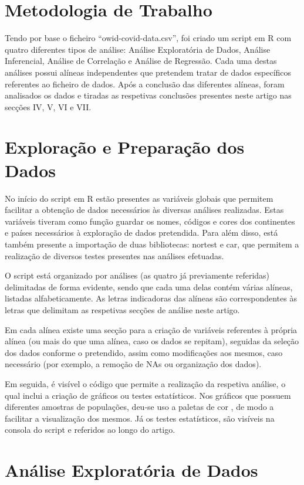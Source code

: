 \documentclass[conference]{IEEEtran}
\begin{document}
\section{Metodologia de Trabalho}
Tendo por base o ficheiro “owid-covid-data.csv”\cite{dataFile}, foi criado um script em R com quatro diferentes tipos de análise: Análise Exploratória de Dados, Análise Inferencial, Análise de Correlação e Análise de Regressão. Cada uma destas análises possui alíneas independentes que pretendem tratar de dados específicos referentes ao ficheiro de dados. Após a conclusão das diferentes alíneas, foram analisados os dados e tiradas as respetivas conclusões presentes neste artigo nas secções IV, V, VI e VII.

\section{Exploração e Preparação dos Dados}
No início do script em R estão presentes as variáveis globais que permitem facilitar a obtenção de dados necessários às diversas análises realizadas. Estas variáveis tiveram como função guardar os nomes, códigos e cores dos continentes e países necessários à exploração de dados pretendida. Para além disso, está também presente a importação de duas bibliotecas: nortest\cite{nortest} e car\cite{car}, que permitem a realização de diversos testes presentes nas análises efetuadas. 

O script está organizado por análises (as quatro já previamente referidas) delimitadas de forma evidente, sendo que cada uma delas contém várias alíneas, listadas alfabeticamente. As letras indicadoras das alíneas são correspondentes às letras que delimitam as respetivas secções de análise neste artigo.

Em cada alínea existe uma secção para a criação de variáveis referentes à própria alínea (ou mais do que uma alínea, caso os dados se repitam), seguidas da seleção dos dados conforme o pretendido, assim como modificações aos mesmos, caso necessário (por exemplo, a remoção de NAs ou organização dos dados). 

Em seguida, é visível o código que permite a realização da respetiva análise, o qual inclui a criação de gráficos ou testes estatísticos. Nos gráficos que possuem diferentes amostras de populações, deu-se uso a paletas de cor \cite{colors}, de modo a facilitar a visualização dos mesmos. Já os testes estatísticos, são visíveis na consola do script e referidos ao longo do artigo.


\section{Análise Exploratória de Dados} %
\end{document}
